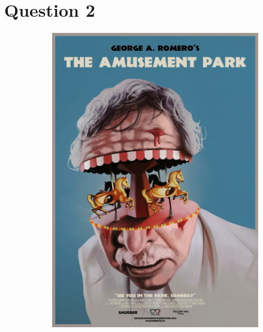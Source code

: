 \documentclass{article}
\begin{document}
\section{Question 2}
\begin{figure}[H]
    \centering
    \begin{subfigure}{.3\textwidth}
        \centering
        \includegraphics[scale=0.1]{q2/amuse.jpg}
    \end{subfigure}
    \begin{subfigure}{.3\textwidth}
        \centering

\end{subfigure}
\end{figure}
\end{document}
